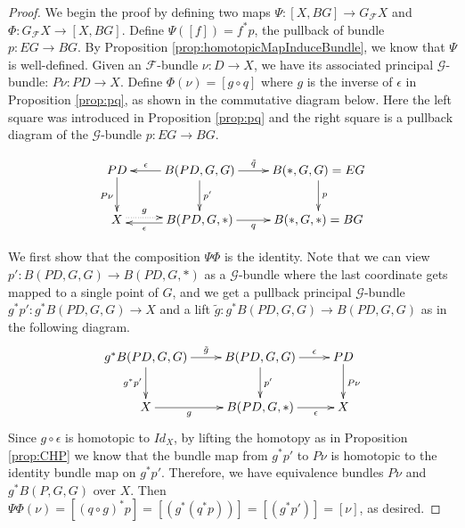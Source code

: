 \documentclass[psamsfonts]{amsart}
\theoremstyle{definition}
\theoremstyle{remark}
\numberwithin{equation}{section}
\begin{document}
\begin{proof}
We begin the proof by defining two maps $\Psi: [X, BG] \rightarrow G_{\mathcal{F}}X$ and $\Phi: G_{\mathcal{F}}X \rightarrow [X, BG]$. Define $\Psi([f]) = f^{*}p$, the pullback of bundle $p: EG \rightarrow BG$. By Proposition \ref{prop:homotopicMapInduceBundle}, we know that $\Psi$ is well-defined. Given an  $\mathcal{F}$-bundle $\nu: D \rightarrow X$, we have its associated principal $\mathcal{G}$-bundle: $P\nu: PD \rightarrow X$. Define $\Phi(\nu) = [g \circ q]$ where $g$ is the inverse of $\epsilon$ in Proposition \ref{prop:pq}, as shown in the commutative diagram below. Here the left square was introduced in Proposition \ref{prop:pq} and the right square is a pullback diagram of the $\mathcal{G}$-bundle $p: EG \to BG$.

\label{pic:pq}
	\[\xymatrix{
PD \ar[d]_{P\nu} & B(PD, G, G) \ar[l]_-{\epsilon} \ar[d]^{p'} \ar[r]^-{\tilde{q}} & B(*, G, G) = EG \ar[d]^{p} \\
X \ar@{.>}[r]<.5ex>^-{g} & B(PD, G, *) \ar[l]<.5ex>^-{\epsilon} \ar[r]_-{q} & B(*, G, *) = BG \\} \]

We first show that the composition $\Psi\Phi$ is the identity. Note that we can view $p': B(PD, G, G) \to B(PD, G, *)$ as a $\mathcal{G}$-bundle where the last coordinate gets mapped to a single point of $G$, and we get a pullback principal $\mathcal{G}$-bundle $g^{*}p': g^{*}B(PD, G, G) \rightarrow X$ and a lift $\tilde{g}: g^{*}B(PD, G, G) \rightarrow B(PD, G, G)$ as in the following diagram. 
\[\xymatrix{
g^{*}B(PD, G, G) \ar[r]^-{\tilde{g}} \ar[d]_{g^{*}p'} & B(PD, G, G) \ar[d]^{p'} \ar[r]^-{\epsilon} & PD \ar[d]^{P\nu}\\
X \ar[r]_-{g} & B(PD, G, *) \ar[r]_-{\epsilon} & X\\} \]
Since $g \circ \epsilon$ is homotopic to $Id_{X}$, by lifting the homotopy as in Proposition \ref{prop:CHP} we know that the bundle map from $g^{*}p'$ to $P\nu$ is homotopic to the identity bundle map on $g^{*}p'$. Therefore, we have equivalence bundles $P\nu$ and $g^{*}B(P, G, G)$ over $X$. Then $\Psi\Phi(\nu) = [(q \circ g)^{*}p] = [(g^{*}(q^{*}p))] = [(g^{*}p')] = [\nu]$, as desired.


\end{proof}
\end{document}
